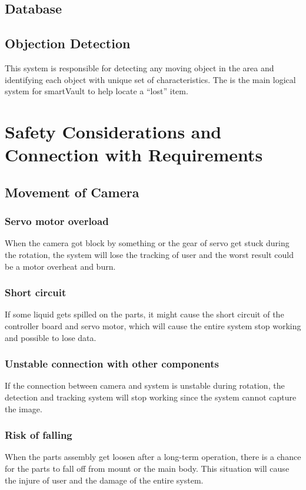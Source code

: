 \documentclass{article}
\begin{document}
\subsection{Database}
\subsection{Objection Detection}
This system is responsible for detecting any moving object in the area and identifying each object with unique set of characteristics. The is the main logical system for smartVault to help locate a “lost” item. 
\section{Safety Considerations and Connection with Requirements}
\subsection{Movement of Camera}
\subsubsection{Servo motor overload}
When the camera got block by something or the gear of servo get stuck during the rotation, the system will lose the tracking of user and the worst result could be a motor overheat and burn.
\subsubsection{Short circuit}
If some liquid gets spilled on the parts, it might cause the short circuit of the controller board and servo motor, which will cause the entire system stop working and possible to lose data.

\subsubsection{Unstable connection with other components}
If the connection between camera and system is unstable during rotation, the detection and tracking system will stop working since the system cannot capture the image.

\subsubsection{Risk of falling}
When the parts assembly get loosen after a long-term operation, there is a chance for the parts to fall off from mount or the main body. This situation will cause the injure of user and the damage of the entire system.
\end{document}
